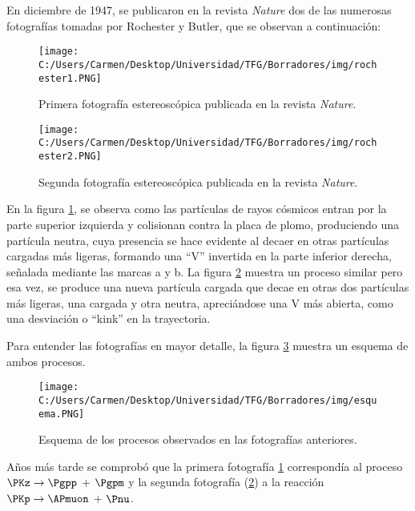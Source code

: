 En diciembre de 1947, se publicaron en la revista \textit{Nature} dos de las numerosas fotografías tomadas por Rochester y Butler, que se observan a continuación:

\begin{figure}[h!]
	\centering
	\texttt{[image: C:/Users/Carmen/Desktop/Universidad/TFG/Borradores/img/rochester1.PNG]}
	\caption[Fotografía 1 de la primera detección de los mesones $\PK$]
	{Primera fotografía estereoscópica publicada en la revista \textit{Nature}. \cite{Nature1}}
	\label{fig:nature1}
\end{figure}
\begin{figure}[h!]
	\centering
	\texttt{[image: C:/Users/Carmen/Desktop/Universidad/TFG/Borradores/img/rochester2.PNG]}
	\caption[Fotografía 2 de la primera detección de los mesones $\PK$]
	{Segunda fotografía estereoscópica publicada en la revista \textit{Nature}. \cite{Nature1}}
	\label{fig:nature2}
\end{figure}

En la figura \ref{fig:nature1}, se observa como las partículas de rayos cósmicos entran por la parte superior izquierda y colisionan contra la placa de plomo, produciendo una partícula neutra, cuya presencia se hace evidente al decaer en otras partículas cargadas más ligeras, formando una ``V'' invertida en la parte inferior derecha, señalada mediante las marcas a y b. La figura \ref{fig:nature2} muestra un proceso similar pero esa vez, se produce una nueva partícula cargada que decae en otras dos partículas más ligeras, una cargada y otra neutra, apreciándose una V más abierta, como una desviación o ``kink'' en la trayectoria.

Para entender las fotografías en mayor detalle, la figura \ref{fig:esquema1} muestra un esquema de ambos procesos.

\begin{figure}[h!]
	\centering
	\texttt{[image: C:/Users/Carmen/Desktop/Universidad/TFG/Borradores/img/esquema.PNG]}
	\caption[Esquema para entender las fotos estereoscópicas]
	{Esquema de los procesos observados en las fotografías anteriores. \cite{Franzini}}
	\label{fig:esquema1}
\end{figure}

Años más tarde se comprobó que la primera fotografía \ref{fig:nature1} correspondía al proceso  $\PKz \rightarrow \Pgpp$ +  $\Pgpm$ y la segunda fotografía (\ref{fig:nature2}) a la reacción $\PKp \rightarrow \APmuon$ + $\Pnu$.

